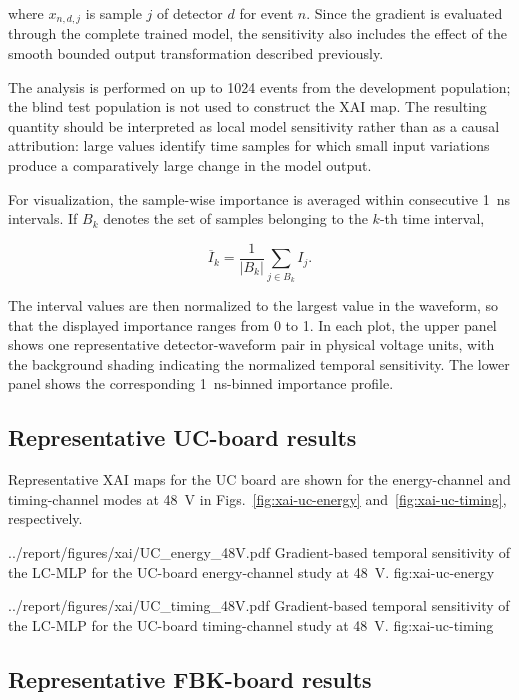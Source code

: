 where \(x_{n,d,j}\) is sample \(j\) of detector \(d\) for event \(n\). Since the gradient is evaluated through the complete trained model, the sensitivity also includes the effect of the smooth bounded output transformation described previously.

The analysis is performed on up to 1024 events from the development population; the blind test population is not used to construct the XAI map. The resulting quantity should be interpreted as local model sensitivity rather than as a causal attribution: large values identify time samples for which small input variations produce a comparatively large change in the model output.

For visualization, the sample-wise importance is averaged within consecutive \SI{1}{ns} intervals. If \(B_k\) denotes the set of samples belonging to the \(k\)-th time interval,

\begin{equation}
    \overline{I}_k
    =
    \frac{1}{|B_k|}
    \sum_{j\in B_k} I_j .
\end{equation}

The interval values are then normalized to the largest value in the waveform, so that the displayed importance ranges from 0 to 1. In each plot, the upper panel shows one representative detector-waveform pair in physical voltage units, with the background shading indicating the normalized temporal sensitivity. The lower panel shows the corresponding \SI{1}{ns}-binned importance profile.

\subsection{Representative UC-board results}

Representative XAI maps for the UC board are shown for the energy-channel and timing-channel modes at \SI{48}{V} in Figs.~\ref{fig:xai-uc-energy} and~\ref{fig:xai-uc-timing}, respectively.

\reportfigure
    {../report/figures/xai/UC_energy_48V.pdf}
    {Gradient-based temporal sensitivity of the LC-MLP for the UC-board energy-channel study at \SI{48}{V}.}
    {fig:xai-uc-energy}

\reportfigure
    {../report/figures/xai/UC_timing_48V.pdf}
    {Gradient-based temporal sensitivity of the LC-MLP for the UC-board timing-channel study at \SI{48}{V}.}
    {fig:xai-uc-timing}

\subsection{Representative FBK-board results}

